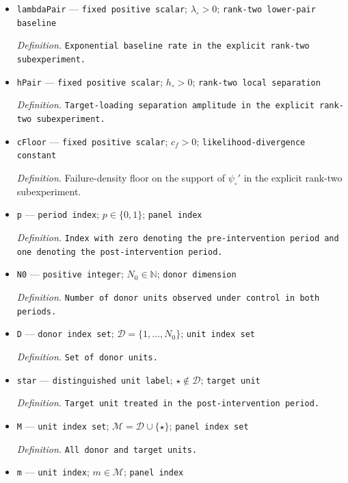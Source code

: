 \documentclass{article}
\begin{document}
\begin{itemize}
  \item \texttt{lambdaPair} --- \texttt{fixed positive scalar}; \(\lambda_\circ>0\); \texttt{rank-\allowbreak{}two lower-\allowbreak{}pair baseline}
  \par\smallskip\noindent\emph{Definition.} \texttt{Exponential baseline rate in the explicit rank-\allowbreak{}two subexperiment.}
  \item \texttt{hPair} --- \texttt{fixed positive scalar}; \(h_\circ>0\); \texttt{rank-\allowbreak{}two local separation}
  \par\smallskip\noindent\emph{Definition.} \texttt{Target-\allowbreak{}loading separation amplitude in the explicit rank-\allowbreak{}two subexperiment.}
  \item \texttt{cFloor} --- \texttt{fixed positive scalar}; \(c_f>0\); \texttt{likelihood-\allowbreak{}divergence constant}
  \par\smallskip\noindent\emph{Definition.} Failure-density floor on the support of \(\psi_\circ'\) in the explicit rank-two subexperiment.
  \item \texttt{p} --- \texttt{period index}; \(p\in\{0,1\}\); \texttt{panel index}
  \par\smallskip\noindent\emph{Definition.} \texttt{Index with zero denoting the pre-\allowbreak{}intervention period and one denoting the post-\allowbreak{}intervention period.}
  \item \texttt{N0} --- \texttt{positive integer}; \(N_0\in\mathbb N\); \texttt{donor dimension}
  \par\smallskip\noindent\emph{Definition.} \texttt{Number of donor units observed under control in both periods.}
  \item \texttt{D} --- \texttt{donor index set}; \(\mathcal D=\{1,\ldots,N_0\}\); \texttt{unit index set}
  \par\smallskip\noindent\emph{Definition.} \texttt{Set of donor units.}
  \item \texttt{star} --- \texttt{distinguished unit label}; \(\star\notin\mathcal D\); \texttt{target unit}
  \par\smallskip\noindent\emph{Definition.} \texttt{Target unit treated in the post-\allowbreak{}intervention period.}
  \item \texttt{M} --- \texttt{unit index set}; \(\mathcal M=\mathcal D\cup\{\star\}\); \texttt{panel index set}
  \par\smallskip\noindent\emph{Definition.} \texttt{All donor and target units.}
  \item \texttt{m} --- \texttt{unit index}; \(m\in\mathcal M\); \texttt{panel index}

\end{itemize}
\end{document}
